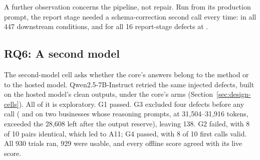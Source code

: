 A further observation concerns the pipeline, not repair. Run from its
production prompt, the report stage needed a schema-correction second call
every time: in all 447 downstream conditions, and for all 16 report-stage
defects at .

\subsection{RQ6: A second model}
\label{sec:results-rq6}

The second-model cell asks whether the core's answers belong to the method or
to the hosted model. Qwen2.5-7B-Instruct retried the same injected defects,
built on the hosted model's clean outputs, under the core's arms
(Section~\ref{sec:design-cells}). All of it is exploratory. G1 passed. G3
excluded four defects before any call ( and  on two businesses
whose reasoning prompts, at 31{,}504--31{,}916 tokens, exceeded the 28{,}608
left after the output reserve), leaving 138. G2 failed, with 8 of 10 pairs
identical, which led to A11; G4 passed, with 8 of 10 first calls valid. All
930 trials ran, 929 were usable, and every offline score agreed with its live
score.

